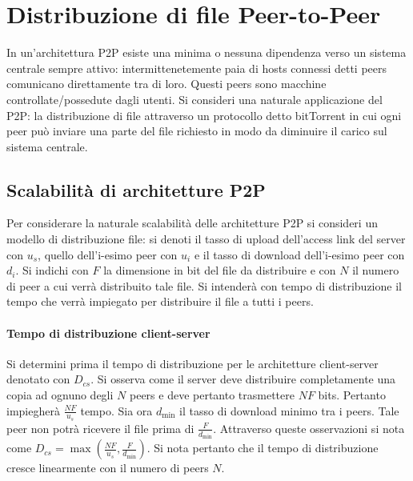 \section{Distribuzione di file Peer-to-Peer}
In un'architettura P2P esiste una minima o nessuna dipendenza verso un sistema centrale sempre attivo: intermittenetemente paia di hosts connessi detti peers 
comunicano direttamente tra di loro. Questi peers sono macchine controllate/possedute dagli utenti. Si consideri una naturale applicazione del P2P: la
distribuzione di file attraverso un protocollo detto bitTorrent in cui ogni peer pu\`o inviare una parte del file richiesto in modo da diminuire il carico
sul sistema centrale.
\subsection{Scalabilit\`a di architetture P2P}
Per considerare la naturale scalabilit\`a delle architetture P2P si consideri un modello di distribuzione file: si denoti il tasso di upload dell'access 
link del server con $u_s$, quello dell'i-esimo peer con $u_i$ e il tasso di download dell'i-esimo peer con $d_i$. Si indichi con $F$ la dimensione in bit
del file da distribuire e con $N$ il numero di peer a cui verr\`a distribuito tale file. Si intender\`a con tempo di distribuzione il tempo che verr\`a 
impiegato per distribuire il file a tutti i peers. 
\paragraph{Tempo di distribuzione client-server}
Si determini prima il tempo di distribuzione per le architetture client-server denotato con $D_{cs}$. Si 
osserva come il server deve distribuire completamente una copia ad ognuno degli $N$ peers e deve pertanto trasmettere $NF$ bits. Pertanto impiegher\`a 
$\frac{NF}{u_s}$ tempo. Sia ora $d_{\min}$ il tasso di download minimo tra i peers. Tale peer non potr\`a ricevere il file prima di $\frac{F}{d_{\min}}$. 
Attraverso queste osservazioni si nota come $D_{cs}=\max(\frac{NF}{u_s}, \frac{F}{d_{\min}})$. Si nota pertanto che il tempo di distribuzione cresce 
linearmente con il numero di peers $N$. 
